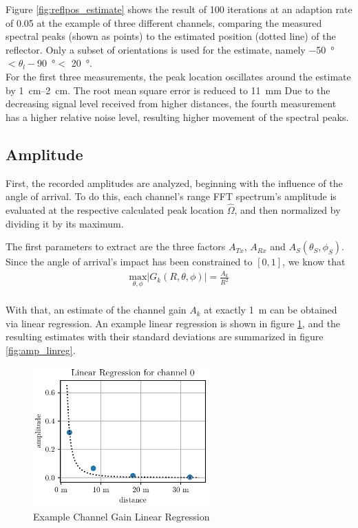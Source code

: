 Figure \ref{fig:reflpos_estimate} shows the result of 100 iterations at an adaption rate of 0.05 at the example of three different channels,
comparing the measured spectral peaks (shown as points) to the estimated position (dotted line) of the reflector.
Only a subset of orientations is used for the estimate,
namely \SI{-50}{\degree} $<\theta_l-$\SI{90}{\degree}$<$ \SI{20}{\degree}. \\

For the first three measurements, the peak location oscillates around the estimate by \SIrange[range-units=single]{1}{2}{\cm}.
The root mean square error is reduced to \SI{11}{\mm}
Due to the decreasing signal level received from higher distances, 
the fourth measurement has a higher relative noise level, resulting higher movement of the spectral peaks.

\subsection{Amplitude}
\label{ssec:amplitude}
First, the recorded amplitudes are analyzed, beginning with the influence of the angle of arrival.
To do this, each channel's range FFT spectrum's amplitude is evaluated at the respective calculated peak location $\hat \Omega$,
and then normalized by dividing it by its maximum.

The first parameters to extract are the three factors $A_{Tx}$, $A_{Rx}$ and $A_S(\theta_S,\phi_S)$.
Since the angle of arrival's impact has been constrained to $[0,1]$, we know that
\begin{align}
    \underset{\theta,\phi}{\text{max}} |G_k(R,\theta,\phi)|  = \frac{A_k}{R^2} \label{eqn:max_G}
\end{align} \\
With that, an estimate of the channel gain $A_k$ at exactly \SI{1}{\meter} can be obtained via linear regression.
An example linear regression is shown in figure \ref{fig:ch0_amp_linreg},
and the resulting estimates with their standard deviations are summarized in figure \ref{fig:amp_linreg}. \\

\begin{figure}
    \centering
    \includegraphics[width=0.6\textwidth]{../figures/ch0_amplitude_linreg.pdf}
    \caption{Example Channel Gain Linear Regression}
    \label{fig:ch0_amp_linreg}
\end{figure}

